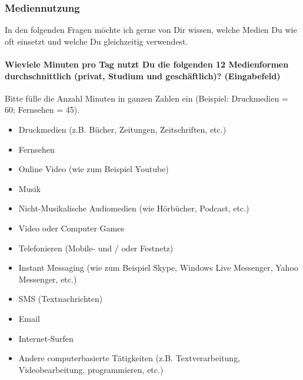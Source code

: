 \subsubsection{Mediennutzung}    
In den folgenden Fragen möchte ich gerne von Dir wissen, welche Medien Du wie oft einsetzt und welche Du gleichzeitig verwendest.
\paragraph{Wieviele Minuten pro Tag nutzt Du die folgenden 12 Medienformen durchschnittlich (privat, Studium und geschäftlich)? (Eingabefeld)}
Bitte fülle die Anzahl Minuten in ganzen Zahlen ein (Beispiel: Druckmedien = 60; Fernsehen = 45).
    \begin{itemize}
      \item Druckmedien (z.B. Bücher, Zeitungen, Zeitschriften, etc.)
      \item Fernsehen
      \item Online Video (wie zum Beispiel Youtube)
      \item Musik
      \item Nicht-Musikalische Audiomedien (wie Hörbücher, Podcast, etc.)
      \item Video oder Computer Games
      \item Telefonieren (Mobile- und / oder Festnetz)
      \item Instant Messaging (wie zum Beispiel Skype, Windows Live Messenger, Yahoo Messenger, etc.)
      \item SMS (Textnachrichten)
      \item Email
      \item Internet-Surfen
      \item Andere computerbasierte Tätigkeiten (z.B. Textverarbeitung, Videobearbeitung, programmieren, etc.)
    \end{itemize} 
